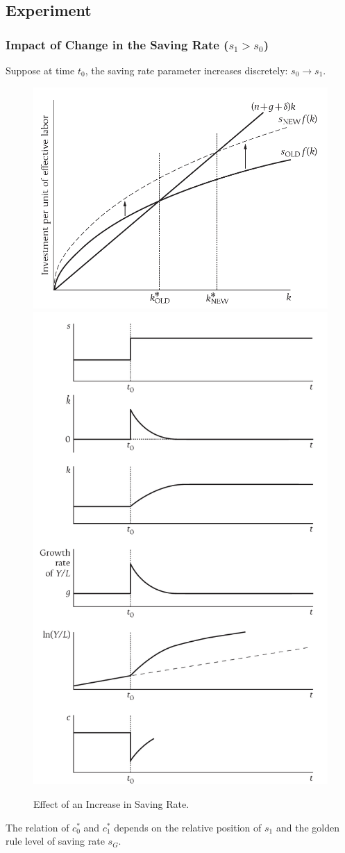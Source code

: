 \documentclass[11pt]{article}
\begin{document}
		\subsection{Experiment}
			\subsubsection{Impact of Change in the Saving Rate ($s_1 > s_0$)}
			\par Suppose at time $t_0$, the saving rate parameter increases discretely: $s_0 \rightarrow s_1$.
			\begin{figure}[H]
				\centering
				\includegraphics[width=0.5\linewidth]{figures/3_3.png}
				\includegraphics[width=0.5\linewidth]{figures/3_4.png}
				\caption{Effect of an Increase in Saving Rate.}
			\end{figure}
			
			\begin{remark}
				The relation of $c_0^*$ and $c_1^*$ depends on the relative position of $s_1$ and the golden rule level of saving rate $s_G$.
			\end{remark}
			
\end{document}

